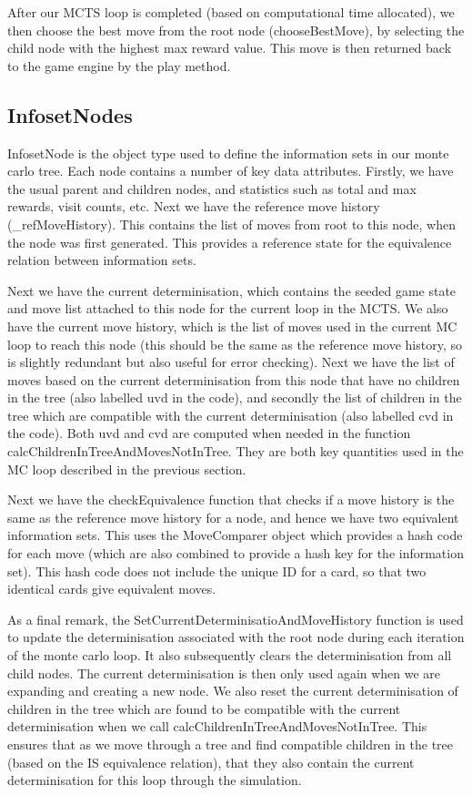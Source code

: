 \documentclass[a4paper,10pt]{article}
\begin{document}
After our MCTS loop is completed (based on computational time allocated), we then choose the best move from the root node (chooseBestMove), by selecting the child node with the highest max reward value. This move is then returned back to the game engine by the play method.

\subsection{InfosetNodes}
InfosetNode is the object type used to define the information sets in our monte carlo tree. Each node contains a number of key data attributes. Firstly, we have the usual parent and children nodes, and statistics such as total and max rewards, visit counts, etc. Next we have the reference move history (\_refMoveHistory). This contains the list of moves from root to this node, when the node was first generated. This provides a reference state for the equivalence relation between information sets. 

Next we have the current determinisation, which contains the seeded game state and move list attached to this node for the current loop in the MCTS. We also have the current move history, which is the list of moves used in the current MC loop to reach this node (this should be the same as the reference move history, so is slightly redundant but also useful for error checking). Next we have the list of moves based on the current determinisation from this node that have no children in the tree (also labelled uvd in the code), and secondly the list of children in the tree which are compatible with the current determinisation (also labelled cvd in the code). Both uvd and cvd are computed when needed in the function calcChildrenInTreeAndMovesNotInTree. They are both key quantities used in the MC loop described in the previous section.

Next we have the checkEquivalence function that checks if a move history is the same as the reference move history for a node, and hence we have two equivalent information sets. This uses the MoveComparer object which provides a hash code for each move (which are also combined to provide a hash key for the information set). This hash code does not include the unique ID for a card, so that two identical cards give equivalent moves.

As a final remark, the SetCurrentDeterminisatioAndMoveHistory function is used to update the determinisation associated with the root node during each iteration of the monte carlo loop. It also subsequently clears the determinisation from all child nodes. The current determinisation is then only used again when we are expanding and creating a new node. We also reset the current determinisation of children in the tree which are found to be compatible with the current determinisation when we call calcChildrenInTreeAndMovesNotInTree. This ensures that as we move through a tree and find compatible children in the tree (based on the IS equivalence relation), that they also contain the current determinisation for this loop through the simulation.
\end{document}
